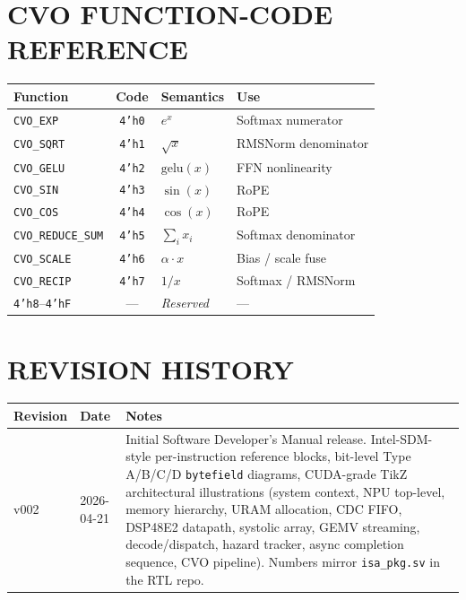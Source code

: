 \documentclass[11pt,a4paper,twoside,openany]{report}
\begin{document}
\chapter{CVO FUNCTION-CODE REFERENCE}

\begin{longtable}{|l|c|l|l|}
\hline
\rowcolor{skytint}
\textbf{Function} & \textbf{Code} & \textbf{Semantics} & \textbf{Use} \\
\hline
\endfirsthead
\texttt{CVO\_EXP}         & \texttt{4'h0} & $e^{x}$             & Softmax numerator \\
\hline
\texttt{CVO\_SQRT}        & \texttt{4'h1} & $\sqrt{x}$          & RMSNorm denominator \\
\hline
\texttt{CVO\_GELU}        & \texttt{4'h2} & $\mathrm{gelu}(x)$  & FFN nonlinearity \\
\hline
\texttt{CVO\_SIN}         & \texttt{4'h3} & $\sin(x)$           & RoPE \\
\hline
\texttt{CVO\_COS}         & \texttt{4'h4} & $\cos(x)$           & RoPE \\
\hline
\texttt{CVO\_REDUCE\_SUM} & \texttt{4'h5} & $\sum_i x_i$        & Softmax denominator \\
\hline
\texttt{CVO\_SCALE}       & \texttt{4'h6} & $\alpha \cdot x$    & Bias / scale fuse \\
\hline
\texttt{CVO\_RECIP}       & \texttt{4'h7} & $1/x$               & Softmax / RMSNorm \\
\hline
\texttt{4'h8}--\texttt{4'hF} & --- & \textit{Reserved} & --- \\
\hline
\end{longtable}

\chapter{REVISION HISTORY}

\begin{longtable}{|l|l|p{9.5cm}|}
\hline
\rowcolor{skytint}
\textbf{Revision} & \textbf{Date} & \textbf{Notes} \\
\hline
\endfirsthead
v002 & 2026-04-21 &
Initial Software Developer's Manual release.  Intel-SDM-style
per-instruction reference blocks, bit-level Type A/B/C/D
\texttt{bytefield} diagrams, CUDA-grade TikZ architectural
illustrations (system context, NPU top-level, memory hierarchy,
URAM allocation, CDC FIFO, DSP48E2 datapath, systolic array, GEMV
streaming, decode/dispatch, hazard tracker, async completion
sequence, CVO pipeline).  Numbers mirror \texttt{isa\_pkg.sv} in
the RTL repo. \\
\hline
\end{longtable}
\end{document}
